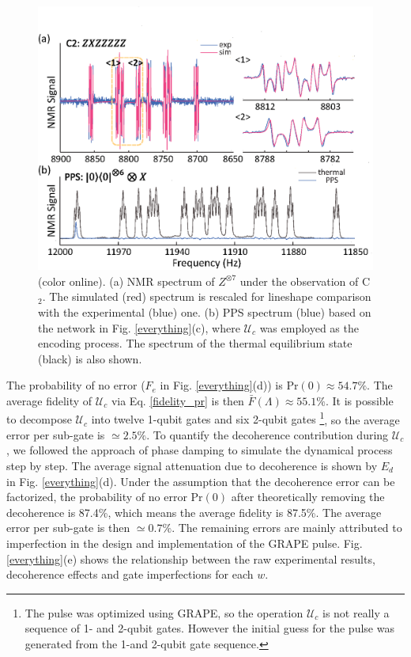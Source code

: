 \documentclass[prl,twocolumn,showpacs]{revtex4-1}
\begin{document}
\begin{figure}[htb]
\begin{center}
\includegraphics[width=\columnwidth]{spectra.eps}
\end{center}
\setlength{\abovecaptionskip}{-0.35cm}
\caption{\footnotesize{(color online). (a) NMR spectrum of $Z^{\otimes 7}$ under the observation of C$_2$. The simulated (red) spectrum is rescaled for lineshape comparison with the experimental (blue) one. (b) PPS spectrum (blue) based on the network in Fig. \ref{everything}(c), where $\mathcal{U}_{c}$ was employed as the encoding process. The spectrum of the thermal equilibrium state (black) is also shown.}}\label{spectra}
\end{figure}

 The probability of no error ($F_e$ in Fig. \ref{everything}(d)) is $\text{Pr}(0)\approx54.7\%$. The average fidelity of $\mathcal{U}_{c}$ via Eq. \eqref{fidelity_pr} is then $\bar{F}(\Lambda)\approx55.1\%$. {It is possible to decompose    $\mathcal{U}_{c}$ into  twelve 1-qubit gates and six 2-qubit gates \footnote{{The pulse was optimized using GRAPE, so the operation $\mathcal{U}_{c}$ is not really a sequence of 1- and 2-qubit  gates. However the initial guess for the pulse was generated from the 1-and 2-qubit gate sequence.}}}, so the average error per sub-gate is  $\simeq 2.5\%$. To quantify the decoherence contribution during $\mathcal{U}_{c}$, we followed the approach of phase damping \cite{Vandersypen2001} to simulate the dynamical process step by step. The average signal attenuation due to decoherence is shown by $E_d$ in Fig. \ref{everything}(d). Under the assumption that the decoherence error can be factorized,  the probability of no error $\text{Pr}(0)$ after theoretically removing the decoherence is 87.4\%, which means the average fidelity is 87.5\%. The average error  per sub-gate is  then $\simeq 0.7\%$. The remaining  errors are  mainly attributed to imperfection in the design and implementation of the GRAPE pulse.  Fig. \ref{everything}(e) shows  the relationship between the raw experimental results, decoherence effects and gate imperfections for each $w$.
\end{document}
